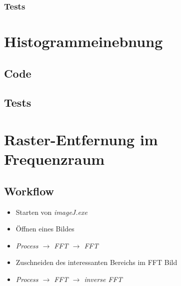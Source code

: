 \documentclass[12pt,german]{article}
\begin{document}
\subsubsection{Tests}

\newpage
\section{Histogrammeinebnung  }
\subsection{Code}

\subsection{Tests}


\newpage
\section{ Raster-Entfernung im Frequenzraum}
\subsection{Workflow}
\begin{itemize}
	\item Starten von \textit{imageJ.exe}
	\item Öffnen eines Bildes
	\item \textit{Process $\rightarrow$ FFT $\rightarrow$ FFT}
	\item Zuschneiden des interessanten Bereichs im FFT Bild
	\item \textit{Process $\rightarrow$ FFT $\rightarrow$ inverse FFT}
\end{itemize}
\end{document}
